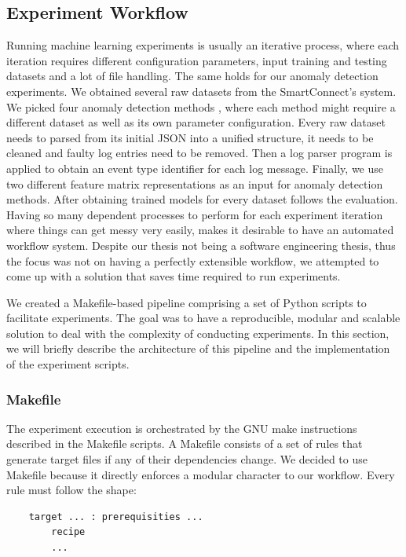 \subsection{Experiment Workflow}
Running machine learning experiments is usually an iterative process, where each iteration requires different configuration parameters, input training and testing datasets and a lot of file handling. The same holds for our anomaly detection experiments. We obtained several raw datasets from the SmartConnect's system. We picked four anomaly detection methods , where each method might require a different dataset as well as its own parameter configuration. Every raw dataset needs to parsed from its initial JSON into a unified structure, it needs to be cleaned and faulty log entries need to be removed. Then a log parser program is applied to obtain an event type identifier for each log message. Finally, we use two different feature matrix representations as an input for anomaly detection methods. After obtaining trained models for every dataset follows the evaluation. Having so many dependent processes to perform for each experiment iteration where things can get messy very easily, makes it desirable to have an automated workflow system. Despite our thesis not being a software engineering thesis, thus the focus was not on having a perfectly extensible workflow, we attempted to come up with a solution that saves time required to run experiments.

We created a Makefile-based pipeline comprising a set of Python scripts to facilitate experiments. The goal was to have a reproducible, modular and scalable solution to deal with the complexity of conducting experiments. In this section, we will briefly describe the architecture of this pipeline and the implementation of the experiment scripts.
 
 \subsubsection*{Makefile}
The experiment execution is orchestrated by the GNU make instructions described in the Makefile scripts. A Makefile consists of a set of rules that generate target files if any of their dependencies change. We decided to use Makefile because it directly enforces a modular character to our workflow. Every rule must follow the shape:

\begin{verbatim}
    target ... : prerequisities ... 
        recipe
        ...
\end{verbatim}

